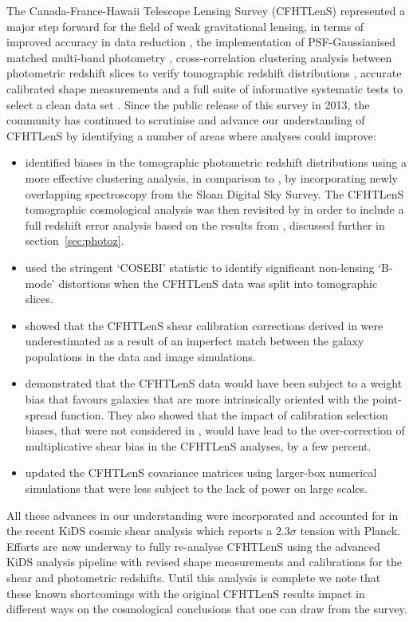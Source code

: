 The Canada-France-Hawaii Telescope Lensing Survey (CFHTLenS) represented a major step forward for the field of weak gravitational lensing, in terms of improved accuracy in data reduction \citep{erben/etal:2013}, the implementation of PSF-Gaussianised matched multi-band photometry \citep{hildebrandt/etal:2012}, cross-correlation clustering analysis between photometric redshift slices to verify tomographic redshift distributions \citep{benjamin/etal:2013}, accurate calibrated shape measurements \citep{miller/etal:2013} and a full suite of informative systematic tests to select a clean data set \citep{heymans/etal:2012}.    Since the public release of this survey in 2013, the community has continued to scrutinise and advance our understanding of CFHTLenS by identifying a number of areas where analyses could improve:
\begin{itemize}
 \item{\citet{choi/etal:2016} identified biases in the tomographic photometric redshift distributions using a more effective clustering analysis, in comparison to \citet{benjamin/etal:2013}, by incorporating newly overlapping spectroscopy from the Sloan Digital Sky Survey.  The CFHTLenS tomographic cosmological analysis was then revisited by \citet{joudaki/etal:2016} in order to include a full redshift error analysis based on the results from \citet{choi/etal:2016}, discussed further in section~\ref{sec:photoz}.}
\item{\citet{asgari/etal:2016} used the stringent `COSEBI' statistic to identify significant non-lensing `B-mode' distortions when the CFHTLenS data was split into tomographic slices.}
\item{\citet{kuijken/etal:2015} showed that the CFHTLenS shear calibration corrections derived in \citet{miller/etal:2013} were underestimated as a result of an imperfect match between the galaxy populations in the data and image simulations.}
\item{\citet{fenechconti/etal:2016} demonstrated that the CFHTLenS data would have been subject to a weight bias that favours galaxies that are more intrinsically oriented with the point-spread function.  They also showed that the impact of calibration selection biases, that were not considered in \citet{miller/etal:2013}, would have lead to the over-correction of multiplicative shear bias in the CFHTLenS analyses, by a few percent.}
\item{\citet{joudaki/etal:2016} updated the CFHTLenS covariance matrices using larger-box numerical simulations that were less subject to the lack of power on large scales.}
\end{itemize}
All these advances in our understanding were incorporated and accounted for in the recent KiDS cosmic shear analysis \citep{hildebrandt/etal:2016} which reports a $2.3 \sigma$ tension with Planck.  Efforts are now underway to fully re-analyse CFHTLenS using the advanced KiDS analysis pipeline with revised shape measurements and calibrations for the shear and photometric redshifts.  Until this analysis is complete we note that these known shortcomings with the original CFHTLenS results impact in different ways on the cosmological conclusions that one can draw from the survey.

